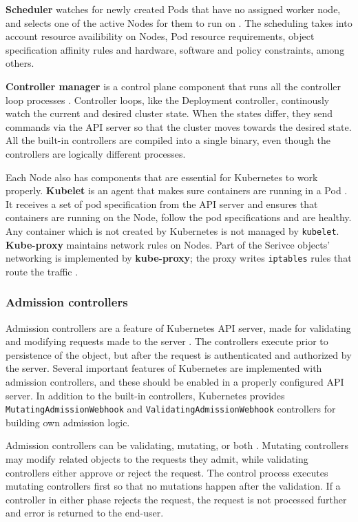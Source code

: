 \documentclass[english, 12pt, a4paper, sci, utf8, a-2b, online]{aaltothesis}
\begin{document}
\textbf{Scheduler} watches for newly created Pods that have no assigned worker node, and selects one of the active Nodes for them to run on \cite{k8s-docs-control-plane}. The scheduling takes into account resource availibility on Nodes, Pod resource requirements, object specification affinity rules and hardware, software and policy constraints, among others.

\textbf{Controller manager} is a control plane component that runs all the controller loop processes \cite{k8s-docs-control-plane}. Controller loops, like the Deployment controller, continously watch the current and desired cluster state. When the states differ, they send commands via the API server so that the cluster moves towards the desired state. All the built-in controllers are compiled into a single binary, even though the controllers are logically different processes.

Each Node also has components that are essential for Kubernetes to work properly. \textbf{Kubelet} is an agent that makes sure containers are running in a Pod \cite{k8s-docs-control-plane}. It receives a set of pod specification from the API server and ensures that containers are running on the Node, follow the pod specifications and are healthy. Any container which is not created by Kubernetes is not managed by \texttt{kubelet}. \textbf{Kube-proxy} maintains network rules on Nodes. Part of the Serivce objects' networking is implemented by \textbf{kube-proxy}; the proxy writes \texttt{iptables} rules that route the traffic \cite{cilium-proxy-free}.

\subsubsection{Admission controllers} \label{admission-controllers}

Admission controllers are a feature of Kubernetes API server, made for  validating and modifying requests made to the server \cite{k8s-docs-admission}. The controllers execute prior to persistence of the object, but after the request is authenticated and authorized by the server. Several important features of Kubernetes are implemented with admission controllers, and these should be enabled in a properly configured API server. In addition to the built-in controllers, Kubernetes provides \texttt{MutatingAdmissionWebhook} and \texttt{ValidatingAdmissionWebhook} controllers for building own admission logic.

Admission controllers can be validating, mutating, or both \cite{k8s-docs-admission}. Mutating controllers may modify related objects to the requests they admit, while validating controllers either approve or reject the request. The control process executes mutating controllers first so that no mutations happen after the validation. If a controller in either phase rejects the request, the request is not processed further and error is returned to the end-user.
\end{document}

